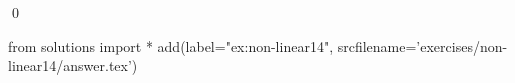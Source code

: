 
\begin{ex} 
  \label{ex:non-linear14}
  
  \qed
\end{ex} 
\begin{python0}
from solutions import *
add(label="ex:non-linear14",
    srcfilename='exercises/non-linear14/answer.tex') 
\end{python0}
